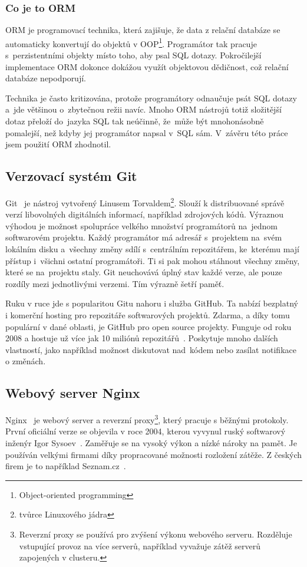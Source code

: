 \subsubsection*{Co je to ORM}

ORM je programovací technika, která zajišuje, že data z relační databáze
se automaticky konvertují do objektů v OOP\footnote{Object-oriented programming}. Programátor tak pracuje s~perzistentními
objekty místo toho, aby psal SQL dotazy. Pokročilejší implementace ORM dokonce dokážou využít objektovou dědičnost, což relační databáze nepodporují.

Technika je často kritizována, protože programátory odnaučuje psát SQL dotazy a~jde většinou o~zbytečnou režii navíc.
Mnoho ORM nástrojů totiž složitější dotaz přeloží do~jazyka SQL tak neúčinně,
že~může být mnohonásobně pomalejší, než kdyby jej programátor napsal v~SQL sám.
V~závěru této práce jsem použití ORM zhodnotil.

\subsection{Verzovací systém Git}

Git~\cite{git} je nástroj vytvořený Linusem Torvaldem\footnote{tvůrce Linuxového jádra}.
Slouží k distribuované správě verzí libovolných digitálních informací, například zdrojových kódů.
Výraznou výhodou je možnost spolupráce velkého množství programátorů na~jednom softwarovém projektu. 
Každý programátor má adresář s~projektem na~svém lokálním disku a~všechny změny sdílí s~centrálním repozitářem,
ke~kterému mají přístup i~všichni ostatní programátoři. Ti si pak mohou stáhnout všechny změny,
které se na~projektu staly. Git neuchovává úplný stav každé verze, ale pouze rozdíly mezi jednotlivými verzemi.
Tím výrazně šetří paměť.  

Ruku v ruce jde s popularitou Gitu nahoru i služba GitHub.
Ta nabízí bezplatný i komerční hosting pro repozitáře softwarových projektů.
Zdarma, a díky tomu populární v dané oblasti, je GitHub pro open source projekty.
Funguje od roku 2008 a hostuje už více jak 10 miliónů repozitářů~\cite{git_about}.
Poskytuje mnoho dalších vlastností, jako například možnost diskutovat nad~kódem
nebo zasílat notifikace o změnách.

\subsection{Webový server Nginx}

Nginx~\cite{nginx} je webový server a reverzní proxy\footnote{Reverzní proxy se používá pro zvýšení výkonu webového serveru.
Rozděluje vstupující provoz na více serverů, například vyvažuje zátěž serverů zapojených v clusteru.}, který pracuje s běžnými protokoly.
První oficiální verze se objevila v roce 2004, kterou vyvynul ruský softwarový inženýr Igor Sysoev~\cite{nginx_changes}.
Zaměřuje se na vysoký výkon a nízké nároky na pamět. Je používán velkými firmami
díky propracované možnosti rozložení zátěže. Z českých firem je to například Seznam.cz~\cite{nginx_seznam}.

